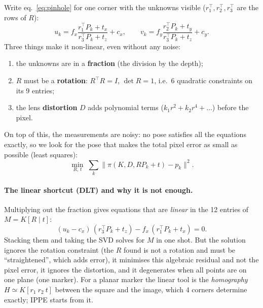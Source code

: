 Write eq.~\ref{eq:pinhole} for one corner with the unknowns visible ($r_1^\top, r_2^\top, r_3^\top$ are the rows of
$R$):
\begin{equation}
u_k = f_x \frac{r_1^\top P_k + t_x}{r_3^\top P_k + t_z} + c_x, \qquad
v_k = f_y \frac{r_2^\top P_k + t_y}{r_3^\top P_k + t_z} + c_y .
\end{equation}
Three things make it non-linear, even without any noise:
\begin{enumerate}[leftmargin=*]
\item the unknowns are in a \textbf{fraction} (the division by the depth);
\item $R$ must be a \textbf{rotation}: $R^\top R = I$, $\det R = 1$, i.e.\ 6 quadratic constraints on its 9 entries;
\item the lens \textbf{distortion} $D$ adds polynomial terms ($k_1 r^2 + k_2 r^4 + \dots$) before the pixel.
\end{enumerate}
On top of this, the measurements are noisy: no pose satisfies all the equations exactly, so we look for the pose
that makes the total pixel error as small as possible (least squares):
\begin{equation}
\min_{R,\,t} \; \sum_k \big\lVert \pi(K, D, R P_k + t) - p_k \big\rVert^2 .
\label{eq:pnp-ls}
\end{equation}

\paragraph{The linear shortcut (DLT) and why it is not enough.} Multiplying out the fraction gives equations that are
\emph{linear} in the 12 entries of $M = K[R \mid t]$:
\begin{equation}
(u_k - c_x)\,(r_3^\top P_k + t_z) - f_x\,(r_1^\top P_k + t_x) = 0 .
\end{equation}
Stacking them and taking the SVD solves for $M$ in one shot. But the solution ignores the rotation constraint (the
$R$ found is not a rotation and must be ``straightened'', which adds error), it minimises this algebraic residual and
not the pixel error, it ignores the distortion, and it degenerates when all points are on one plane (one marker). For
a planar marker the linear tool is the \emph{homography} $H \simeq K[r_1\ r_2\ t]$ between the square and the image, which
4 corners determine exactly; IPPE starts from it.

